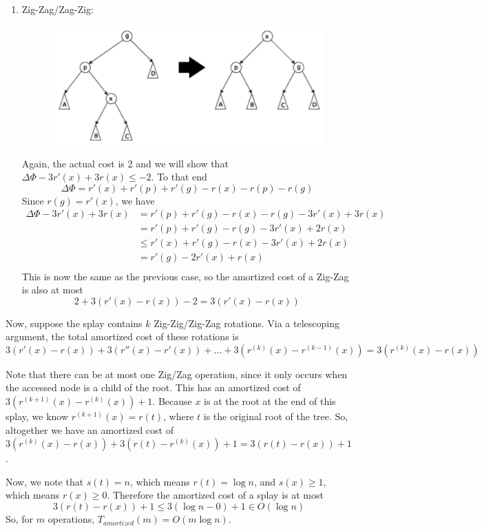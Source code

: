 \documentclass[12pt]{article}
\begin{document}
\begin{enumerate}
  \item Zig-Zag/Zag-Zig:
  \begin{figure}[!ht]
    \centering
    \includegraphics[scale=0.33]{pics/splay_zig_zag2}
  \end{figure}

  Again, the actual cost is 2 and we will show that $\Delta\Phi - 3r'(x) + 3r(x) \leq -2$. To that end
  \[ \Delta\Phi = r'(x) + r'(p)+ r'(g) - r(x) - r(p) - r(g) \]
  Since $r(g) = r'(x)$, we have
  \begin{align*}
    \Delta\Phi - 3r'(x) + 3r(x) &= r'(p) + r'(g) - r(x) - r(g) - 3r'(x) + 3r(x) \\
    &= r'(p) + r'(g) - r(g) - 3r'(x) + 2r(x) \\
    &\leq r'(x) + r'(g) - r(x) - 3r'(x) + 2r(x) \\
    &= r'(g) - 2r'(x) + r(x) \\
  \end{align*}
  This is now the same as the previous case, so the amortized cost of a Zig-Zag is also at most
  \[ 2 + 3(r'(x) - r(x)) - 2 = 3(r'(x) - r(x)) \]
\end{enumerate}

Now, suppose the splay contains  $k$ Zig-Zig/Zig-Zag rotations. Via a telescoping argument, the total amortized cost of these rotations is
\[ 3(r'(x) - r(x)) + 3(r''(x) - r'(x)) + \ldots + 3(r^{(k)}(x) - r^{(k-1)}(x)) = 3(r^{(k)}(x) - r(x)) \]

Note that there can be at most one Zig/Zag operation, since it only occurs when the accessed node is a child of the root. This has an amortized cost of $3(r^{(k+1)}(x) - r^{(k)}(x)) + 1$. Because $x$ is at the root at the end of this splay, we know $r^{(k+1)}(x) = r(t)$, where $t$ is the original root of the tree. So, altogether we have an amortized cost of $3(r^{(k)}(x) - r(x)) + 3(r(t) - r^{(k)}(x)) + 1 = 3(r(t) - r(x)) + 1$.

Now, we note that $s(t) = n$, which means $r(t) = \log n$, and $s(x) \geq 1$, which means $r(x) \geq 0$. Therefore the amortized cost of a splay is at most
\[ 3(r(t) - r(x)) + 1 \leq 3(\log n - 0) + 1 \in O(\log n)\]
So, for $m$ operations, $T_{amortized}(m) = O(m \log n)$.
\end{document}
